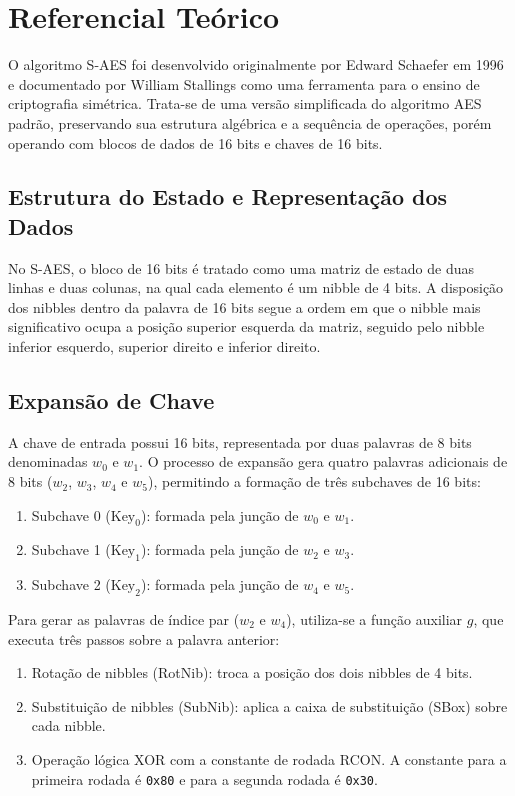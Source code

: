 \documentclass[12pt,a4paper]{article}
\begin{document}
\section{Referencial Teórico}

O algoritmo S-AES foi desenvolvido originalmente por Edward Schaefer em 1996 e documentado por William Stallings como uma ferramenta para o ensino de criptografia simétrica. Trata-se de uma versão simplificada do algoritmo AES padrão, preservando sua estrutura algébrica e a sequência de operações, porém operando com blocos de dados de 16 bits e chaves de 16 bits.

\subsection{Estrutura do Estado e Representação dos Dados}

No S-AES, o bloco de 16 bits é tratado como uma matriz de estado de duas linhas e duas colunas, na qual cada elemento é um nibble de 4 bits. A disposição dos nibbles dentro da palavra de 16 bits segue a ordem em que o nibble mais significativo ocupa a posição superior esquerda da matriz, seguido pelo nibble inferior esquerdo, superior direito e inferior direito.

\subsection{Expansão de Chave}

A chave de entrada possui 16 bits, representada por duas palavras de 8 bits denominadas $w_0$ e $w_1$. O processo de expansão gera quatro palavras adicionais de 8 bits ($w_2$, $w_3$, $w_4$ e $w_5$), permitindo a formação de três subchaves de 16 bits:

\begin{enumerate}
    \item Subchave 0 ($\text{Key}_0$): formada pela junção de $w_0$ e $w_1$.
    \item Subchave 1 ($\text{Key}_1$): formada pela junção de $w_2$ e $w_3$.
    \item Subchave 2 ($\text{Key}_2$): formada pela junção de $w_4$ e $w_5$.
\end{enumerate}

Para gerar as palavras de índice par ($w_2$ e $w_4$), utiliza-se a função auxiliar $g$, que executa três passos sobre a palavra anterior:

\begin{enumerate}
    \item Rotação de nibbles (RotNib): troca a posição dos dois nibbles de 4 bits.
    \item Substituição de nibbles (SubNib): aplica a caixa de substituição (SBox) sobre cada nibble.
    \item Operação lógica XOR com a constante de rodada RCON. A constante para a primeira rodada é \texttt{0x80} e para a segunda rodada é \texttt{0x30}.
\end{enumerate}
\end{document}
